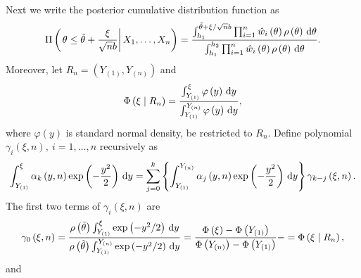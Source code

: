 Next we write the posterior cumulative distribution function as 
\[
\Pi\left(\left.\theta\le\tilde{\theta}+\frac{\xi}{\sqrt{n}b}\right|X_{1},\ldots,X_{n}\right)=\frac{\int_{h_{1}}^{\tilde{\theta}+\xi/\sqrt{n}b}\prod_{i=1}^{n}\hat{w}_{i}\left(\theta\right)\rho\left(\theta\right)\,\mathrm{d}\theta}{\int_{h_{1}}^{h_{2}}\prod_{i=1}^{n}\hat{w}_{i}\left(\theta\right)\rho\left(\theta\right)\,\mathrm{d}\theta}.
\]
Moreover, let $R_{n}=\left(Y_{\left(1\right)},Y_{\left(n\right)}\right)$
and 
\[
\Phi\left(\xi\mid R_{n}\right)=\frac{\int_{Y_{\left(1\right)}}^{\xi}\varphi\left(y\right)\,\mathrm{d} y}{\int_{Y_{\left(1\right)}}^{Y_{\left(n\right)}}\varphi\left(y\right)\,\mathrm{d} y},
\]
where $\varphi\left(y\right)$ is standard normal density, be restricted
to $R_{n}$. Define polynomial $\gamma_{i}\left(\xi,n\right),\: i=1,\ldots,n$
recursively as 
\[
\int_{Y_{\left(1\right)}}^{\xi}\alpha_{k}\left(y,n\right)\exp\left(-\frac{y^{2}}{2}\right)\,\mathrm{d} y=\sum_{j=0}^{k}\left\{ \int_{Y_{\left(1\right)}}^{Y_{\left(n\right)}}\alpha_{j}\left(y,n\right)\exp\left(-\frac{y^{2}}{2}\right)\,\mathrm{d} y\right\} \gamma_{k-j}\left(\xi,n\right).
\]
The first two terms of $\gamma_{i}\left(\xi,n\right)$ are
\[
\gamma_{0}\left(\xi,n\right)=\frac{\rho\left(\tilde{\theta}\right)\int_{Y_{\left(1\right)}}^{\xi}\exp\left(-y^{2}/2\right)\,\mathrm{d} y}{\rho\left(\tilde{\theta}\right)\int_{Y_{\left(1\right)}}^{Y_{\left(n\right)}}\exp\left(-y^{2}/2\right)\,\mathrm{d} y}=\frac{\Phi\left(\xi\right)-\Phi\left(Y_{\left(1\right)}\right)}{\Phi\left(Y_{\left(n\right)}\right)-\Phi\left(Y_{\left(1\right)}\right)}-=\Phi\left(\xi\mid R_{n}\right),
\]
and 
